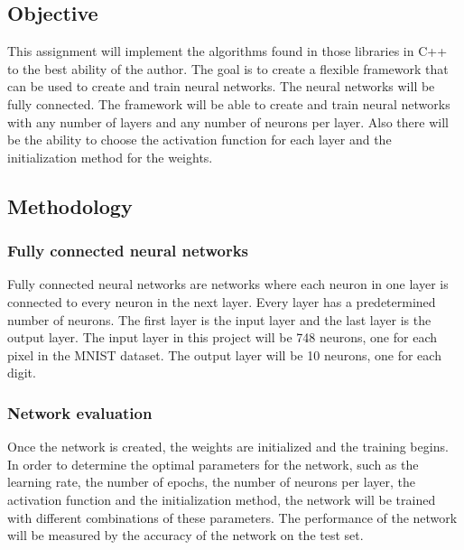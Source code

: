 \subsection{Objective}

This assignment will implement the algorithms found in those libraries in C++ to the best ability of the author. The goal is to
create a flexible framework that can be used to create and train neural networks. The neural networks will be fully connected. 
The framework will be able to create and train neural networks with any number of layers and any number of neurons per layer.
Also there will be the ability to choose the activation function for each layer and the initialization method for the weights.

\subsection{Methodology}
\subsubsection{Fully connected neural networks}

Fully connected neural networks are networks where each neuron in one layer is connected to every neuron in the next layer. Every
layer has a predetermined number of neurons. The first layer is the input layer and the last layer is the output layer. The input
layer in this project will be 748 neurons, one for each pixel in the MNIST dataset. The output layer will be 10 neurons, one for
each digit.

\subsubsection{Network evaluation}
Once the network is created, the weights are initialized and the training begins. In order to determine the optimal parameters 
for the network, such as the learning rate, the number of epochs, the number of neurons per layer, the activation function and the
initialization method, the network will be trained with different combinations of these parameters. The performance of the network
will be measured by the accuracy of the network on the test set.